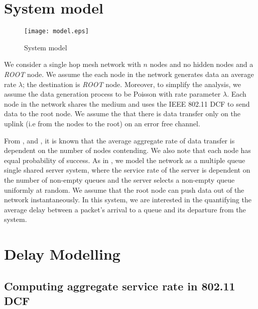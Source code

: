 \documentclass[10pt, conference, compsocconf]{IEEEtran}
\begin{document}
\section{\large{System model}}
\label{model}
\begin{figure}[h]
\centering
\texttt{[image: model.eps]}
\caption {System model}
\label{fig:model}
\end{figure}

We consider a single hop mesh network with $n$ nodes and no hidden nodes and a \textit{ROOT} node. We assume the each node in the network generates data an average rate $\lambda$; the destination is \textit{ROOT} node. Moreover, to simplify the analysis, we assume the data generation process to be Poisson with rate parameter $\lambda$. Each node in the network shares the medium and uses the IEEE 802.11 DCF to send data to the root node. We assume the that there is data transfer only on the uplink (i.e from the nodes to the root) on an error free channel. 

From \cite{bianchi}, \cite{tay} and \cite{akumar}, it is known that the average aggregate rate of data transfer is dependent on the number of nodes contending. We also note that each node has equal probability of success. As in \cite{tobagi}, we model the network as a multiple queue single shared server system, where the service rate of the server is dependent on the number of non-empty queues and the server selects a non-empty queue uniformly at random. We assume that the root node can push data out of the network instantaneously. In this system, we are interested in the quantifying the average delay between a packet's arrival to a queue and its departure from the system. 

\section{\large{Delay Modelling}}
\label{analysis}

\subsection{Computing aggregate service rate in 802.11 DCF}
\end{document}
